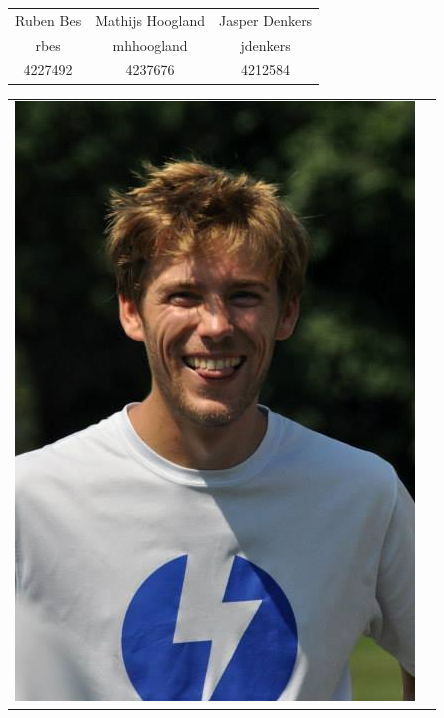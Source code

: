 \begin{titlepage}
\begin{center}
\begin{table}[ht]
\begin{tabular}{ccc}
Ruben Bes	& Mathijs Hoogland	& Jasper Denkers\\
rbes 		& mhhoogland 		& jdenkers\\
4227492 	& 4237676 			& 4212584\\
\end{tabular}
\end{table}

\begin{table}[ht]
\centering
\begin{tabular}{cc}
\includegraphics[scale=0.2]{../photos/robbert.png} &

\end{tabular}
\end{table}
\end{center}
\end{titlepage}
